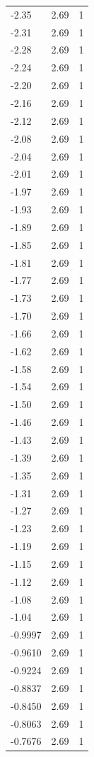 \begin{longtable}{lrr}
  -2.35 & 2.69 & 1 \\
  -2.31 & 2.69 & 1 \\
  -2.28 & 2.69 & 1 \\
  -2.24 & 2.69 & 1 \\
  -2.20 & 2.69 & 1 \\
  -2.16 & 2.69 & 1 \\
  -2.12 & 2.69 & 1 \\
  -2.08 & 2.69 & 1 \\
  -2.04 & 2.69 & 1 \\
  -2.01 & 2.69 & 1 \\
  -1.97 & 2.69 & 1 \\
  -1.93 & 2.69 & 1 \\
  -1.89 & 2.69 & 1 \\
  -1.85 & 2.69 & 1 \\
  -1.81 & 2.69 & 1 \\
  -1.77 & 2.69 & 1 \\
  -1.73 & 2.69 & 1 \\
  -1.70 & 2.69 & 1 \\
  -1.66 & 2.69 & 1 \\
  -1.62 & 2.69 & 1 \\
  -1.58 & 2.69 & 1 \\
  -1.54 & 2.69 & 1 \\
  -1.50 & 2.69 & 1 \\
  -1.46 & 2.69 & 1 \\
  -1.43 & 2.69 & 1 \\
  -1.39 & 2.69 & 1 \\
  -1.35 & 2.69 & 1 \\
  -1.31 & 2.69 & 1 \\
  -1.27 & 2.69 & 1 \\
  -1.23 & 2.69 & 1 \\
  -1.19 & 2.69 & 1 \\
  -1.15 & 2.69 & 1 \\
  -1.12 & 2.69 & 1 \\
  -1.08 & 2.69 & 1 \\
  -1.04 & 2.69 & 1 \\
  -0.9997 & 2.69 & 1 \\
  -0.9610 & 2.69 & 1 \\
  -0.9224 & 2.69 & 1 \\
  -0.8837 & 2.69 & 1 \\
  -0.8450 & 2.69 & 1 \\
  -0.8063 & 2.69 & 1 \\
  -0.7676 & 2.69 & 1 \\

\end{longtable}
